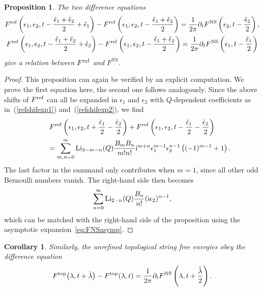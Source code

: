 \documentclass[pdftex]{sigma}
\numberwithin{equation}{section}
\newtheorem{Corollary}[Theorem]{Corollary}
\newtheorem{Proposition}[Theorem]{Proposition}
 { \theoremstyle{definition}
\newtheorem{Definition}[Theorem]{Definition}
\newtheorem{Note}[Theorem]{Note}
\newtheorem{Example}[Theorem]{Example}
\newtheorem{Remark}[Theorem]{Remark} }
\begin{document}
\begin{Proposition}
The two difference equations
\begin{gather}
 F^{{\rm ref}}\left(\epsilon_1,\epsilon_2,t- \frac{\check\epsilon_1+\check\epsilon_2}{2} + \check{\epsilon}_1\right)- F^{{\rm ref}}\left(\epsilon_1,\epsilon_2,t- \frac{\check\epsilon_1+\check\epsilon_2}{2} \right) = \frac{1}{2\pi} \partial_t F^{\mathrm{NS}} \left(\epsilon_2,t-\frac{\check\epsilon_2}{2}\right), \nonumber\\
 F^{{\rm ref}}\left(\epsilon_1,\epsilon_2,t- \frac{\check\epsilon_1+\check\epsilon_2}{2} + \check{\epsilon}_2\right)- F^{{\rm ref}}\left(\epsilon_1,\epsilon_2,t- \frac{\check\epsilon_1+\check\epsilon_2}{2} \right) = \frac{1}{2\pi} \partial_t F^{\mathrm{NS}} \left(\epsilon_1,t-\frac{\check\epsilon_1}{2}\right)\label{eq:relfreffns}
\end{gather}
give a relation between $F^{{\rm ref}}$ and $F^{\mathrm{NS}}$.
\end{Proposition}
\begin{proof}
This proposition can again be verified by an explicit computation. We prove the first equation here, the second one follows analogously. Since the above shifts of $F^{\rm ref}$ can all be expanded in $\epsilon_1$ and $\epsilon_2$ with $Q$-dependent coefficients as in~(\ref{refshifexp1}) and~(\ref{refshifexp2}), we find
\begin{gather*}
 F^{{\rm ref}}\left(\epsilon_1,\epsilon_2,t+\frac{\check{\epsilon}_1}{2}-\frac{\check{\epsilon}_2}{2}\right)+ F^{{\rm ref}}\left(\epsilon_1,\epsilon_2,t-\frac{\check{\epsilon}_1}{2}-\frac{\check{\epsilon}_2}{2}\right) \\
\qquad{} =\sum_{m,n=0}^{\infty}{\rm Li}_{3-m-n}(Q) \frac{B_m B_n}{m! n!} \mathrm{i}^{m+n} \epsilon_1^{m-1} \epsilon_2^{n-1}\left((-1)^{m-1}+1\right).
 \end{gather*}
The last factor in the summand only contributes when $m=1$, since all other odd Bernoulli numbers vanish. The right-hand side then becomes
\begin{equation*}
 \sum_{n=0}^{\infty}{\rm Li}_{2-n}(Q) \frac{B_n}{ n!} (\mathrm{i}\epsilon_2)^{n-1},
 \end{equation*}
which can be matched with the right-hand side of the proposition using the asymptotic expan\-sion~\eqref{eq:FNSasymp}.
\end{proof}

\begin{Corollary}
Similarly, the unrefined topological string free energies obey the difference equation
\begin{align}\label{eq:ftopfnsrel}
 F^{\rm top}\big(\lambda,t +\check{\lambda}\big)- F^{\rm top}(\lambda,t) = \frac{1}{2\pi} \partial_t F^{\mathrm{NS}} \left(\lambda,t+\frac{\check{\lambda}}{2}\right).
\end{align}
\end{Corollary}
\end{document}
